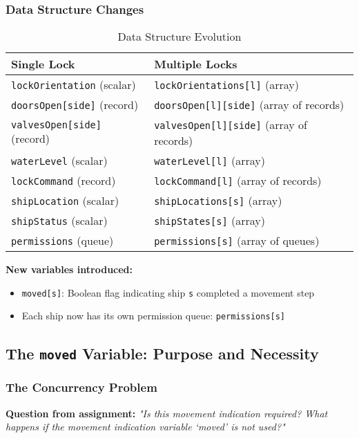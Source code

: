 \documentclass[12pt,a4paper]{article}
\begin{document}
\subsubsection{Data Structure Changes}

\begin{table}[h]
\centering
\begin{tabular}{ll}
\toprule
\textbf{Single Lock} & \textbf{Multiple Locks} \\
\midrule
\texttt{lockOrientation} (scalar) & \texttt{lockOrientations[l]} (array) \\
\texttt{doorsOpen[side]} (record) & \texttt{doorsOpen[l][side]} (array of records) \\
\texttt{valvesOpen[side]} (record) & \texttt{valvesOpen[l][side]} (array of records) \\
\texttt{waterLevel} (scalar) & \texttt{waterLevel[l]} (array) \\
\texttt{lockCommand} (record) & \texttt{lockCommand[l]} (array of records) \\
\texttt{shipLocation} (scalar) & \texttt{shipLocations[s]} (array) \\
\texttt{shipStatus} (scalar) & \texttt{shipStates[s]} (array) \\
\texttt{permissions} (queue) & \texttt{permissions[s]} (array of queues) \\
\bottomrule
\end{tabular}
\caption{Data Structure Evolution}
\end{table}

\textbf{New variables introduced:}
\begin{itemize}
    \item \texttt{moved[s]}: Boolean flag indicating ship \texttt{s} completed a movement step
    \item Each ship now has its own permission queue: \texttt{permissions[s]}
\end{itemize}

\subsection{The \texttt{moved} Variable: Purpose and Necessity}

\subsubsection{The Concurrency Problem}

\textbf{Question from assignment:} \textit{"Is this movement indication required? What happens if the movement indication variable `moved' is not used?"}
\end{document}
